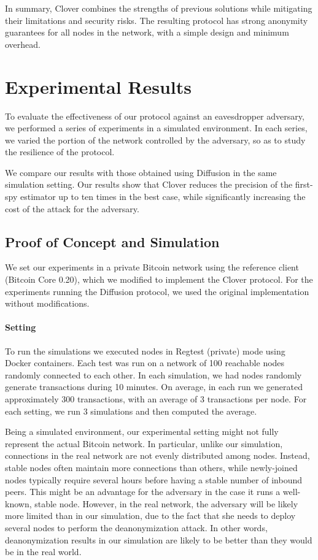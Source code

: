 \documentclass{article}
\begin{document}
	In summary, Clover combines the strengths of previous solutions while mitigating their limitations and security risks.
	The resulting protocol has strong anonymity guarantees for all nodes in the network, with a simple design and minimum overhead.
	
	
	
	\section{Experimental Results}
	\label{sec:experiments}
	To evaluate the effectiveness of our protocol against an eavesdropper adversary, we performed a series of experiments in a simulated environment.
	In each series, we varied the portion of the network controlled by the adversary, so as to study the resilience of the protocol.
	
	We compare our results with those obtained using Diffusion in the same simulation setting.
	Our results show that Clover reduces the precision of the first-spy estimator up to ten times in the best case,
	while significantly increasing the cost of the attack for the adversary.
	
	\subsection{Proof of Concept and Simulation}
	We set our experiments in a private Bitcoin network using the reference client (Bitcoin Core 0.20), which we modified to implement the Clover protocol.
	For the experiments running the Diffusion protocol, we used the original implementation without modifications.
	
	\paragraph{Setting}
	To run the simulations we executed nodes in Regtest (private) mode using Docker containers.
	Each test was run on a network of 100 reachable nodes randomly connected to each other.
	In each simulation, we had nodes randomly generate transactions during 10 minutes.
	On average, in each run we generated approximately 300 transactions, with an average of 3 transactions per node.
	For each setting, we run 3 simulations and then computed the average.
	
	Being a simulated environment, our experimental setting might not fully represent the actual Bitcoin network.
	In particular, unlike our simulation, connections in the real network are not evenly distributed among nodes.
	Instead, stable nodes often maintain more connections than others, while newly-joined nodes typically require several hours before having a stable number of inbound peers.
	This might be an advantage for the adversary in the case it runs a well-known, stable node.
	However, in the real network, the adversary will be likely more limited than in our simulation, due to the fact that she needs to deploy several nodes to perform the deanonymization attack. 
	In other words, deanonymization results in our simulation are likely to be better than they would be in the real world.
	
\end{document}
